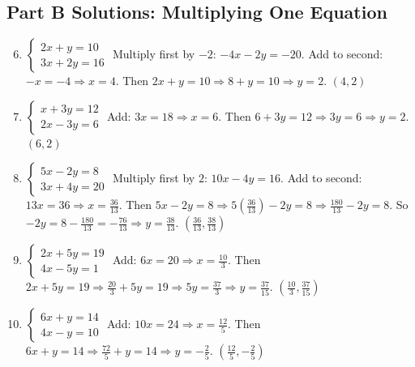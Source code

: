 \documentclass[14pt]{extarticle}
\begin{document}
\subsection*{Part B Solutions: Multiplying One Equation}
\begin{enumerate}
  \setcounter{enumi}{5}
  \item \(\begin{cases} 2x + y = 10 \\ 3x + 2y = 16 \end{cases}\)  
  Multiply first by \(-2\): \(-4x - 2y = -20\). Add to second: \(-x = -4 \Rightarrow x = 4\). Then \(2x + y = 10 \Rightarrow 8 + y = 10 \Rightarrow y = 2\).  
  \(\boxed{(4, 2)}\)

  \item \(\begin{cases} x + 3y = 12 \\ 2x - 3y = 6 \end{cases}\)  
  Add: \(3x = 18 \Rightarrow x = 6\). Then \(6 + 3y = 12 \Rightarrow 3y = 6 \Rightarrow y = 2\).  
  \(\boxed{(6, 2)}\)

  \item \(\begin{cases} 5x - 2y = 8 \\ 3x + 4y = 20 \end{cases}\)  
  Multiply first by \(2\): \(10x - 4y = 16\). Add to second: \(13x = 36 \Rightarrow x = \tfrac{36}{13}\).  
  Then \(5x - 2y = 8 \Rightarrow 5(\tfrac{36}{13}) - 2y = 8 \Rightarrow \tfrac{180}{13} - 2y = 8\).  
  So \(-2y = 8 - \tfrac{180}{13} = -\tfrac{76}{13} \Rightarrow y = \tfrac{38}{13}\).  
  \(\boxed{(\tfrac{36}{13}, \tfrac{38}{13})}\)

  \item \(\begin{cases} 2x + 5y = 19 \\ 4x - 5y = 1 \end{cases}\)  
  Add: \(6x = 20 \Rightarrow x = \tfrac{10}{3}\). Then \(2x + 5y = 19 \Rightarrow \tfrac{20}{3} + 5y = 19 \Rightarrow 5y = \tfrac{37}{3} \Rightarrow y = \tfrac{37}{15}\).  
  \(\boxed{(\tfrac{10}{3}, \tfrac{37}{15})}\)

  \item \(\begin{cases} 6x + y = 14 \\ 4x - y = 10 \end{cases}\)  
  Add: \(10x = 24 \Rightarrow x = \tfrac{12}{5}\). Then \(6x + y = 14 \Rightarrow \tfrac{72}{5} + y = 14 \Rightarrow y = -\tfrac{2}{5}\).  
  \(\boxed{(\tfrac{12}{5}, -\tfrac{2}{5})}\)
\end{enumerate}
\end{document}

